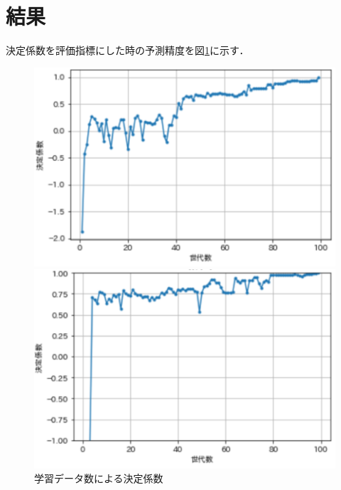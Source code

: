 \documentclass[main]{subfiles}
\begin{document}
    \section{結果}
    決定係数を評価指標にした時の予測精度を図\ref{data_1}に示す．
    \begin{figure}
        \begin{minipage}[b]{0.45\linewidth}
          \centering
          \includegraphics[width=\linewidth]{figures/s_r.png}
        \end{minipage}
        \begin{minipage}[b]{0.45\linewidth}
          \centering
          \includegraphics[width=\linewidth]{figures/s_mae.png}
        \end{minipage}
        \caption{学習データ数による決定係数}
        \label{data_1}
      \end{figure}
\end{document}
